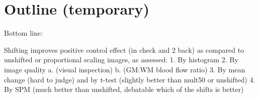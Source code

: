 \section{Outline (temporary)}
Bottom line:

Shifting improves positive control effect (in check and 2 back) as compared to unshifted or proportional scaling images, as assessed:
1. By histogram
2. By image quality 
a. (visual inspection) 
b. (GM:WM blood flow ratio)
3. By mean change (hard to judge) and by t-test (slightly better than mult50 or unshifted)
4. By SPM  (much better than unshifted, debatable which of the shifts is better)

